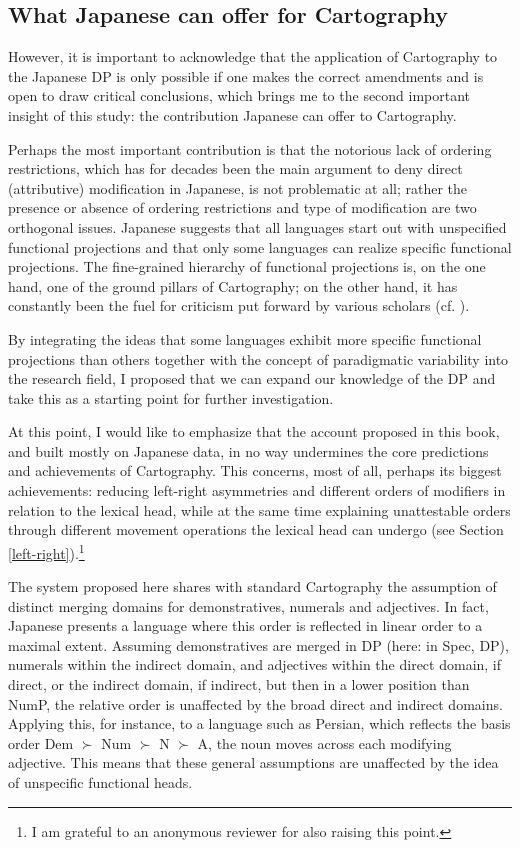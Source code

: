 \subsection{What Japanese can offer for Cartography} \label{discussion u20}

However, it is important to acknowledge that the application of Cartography to the Japanese DP is only possible if one makes the correct amendments and is open to draw critical conclusions, which brings me to the second important insight of this study: the contribution Japanese can offer to Cartography.

Perhaps the most important contribution is that the notorious lack of ordering restrictions, which has for decades been the main argument to deny direct (attributive) modification in Japanese, is not problematic at all; rather the presence or absence of ordering restrictions and type of modification are two orthogonal issues. Japanese suggests that all languages start out with unspecified functional projections and that only some languages can realize specific functional projections. The fine-grained hierarchy of functional projections is, on the one hand, one of the ground pillars of Cartography; on the other hand, it has constantly been the fuel for criticism put forward by various scholars (cf. \citealt{larson:2021:rethinking}).

By integrating the ideas that some languages exhibit more specific functional projections than others together with the concept of paradigmatic variability into the research field, I proposed that we can expand our knowledge of the DP and take this as a starting point for further investigation.

At this point, I would like to emphasize that the account proposed in this book, and built mostly on Japanese data, in no way undermines the core predictions and achievements of Cartography. This concerns, most of all, perhaps its biggest achievements: reducing left-right asymmetries and different orders of modifiers in relation to the lexical head, while at the same time explaining unattestable \citep{cinque:2025:superiority} orders through different movement operations the lexical head can undergo (see Section \ref{left-right}).\footnote{I am grateful to an anonymous reviewer for also raising this point.}  

The system proposed here shares with standard Cartography the assumption of distinct merging domains for demonstratives, numerals and adjectives. In fact, Japanese presents a language where this order is reflected in linear order to a maximal extent. Assuming demonstratives are merged in DP (here: in Spec, DP), numerals within the indirect domain, and adjectives within the direct domain, if direct, or the indirect domain, if indirect, but then in a lower position than NumP, the relative order is unaffected by the broad direct and indirect domains. Applying this, for instance, to a language such as  Persian, which reflects the basis order Dem $\succ$ Num $\succ$ N $\succ$ A, the noun moves across each modifying adjective. This means that these general assumptions are unaffected by the idea of unspecific functional heads.

